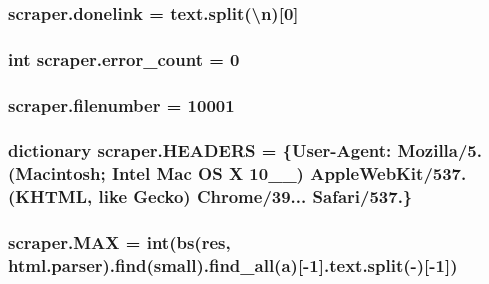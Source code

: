 \subsubsection[{\texorpdfstring{donelink}{donelink}}]{\setlength{\rightskip}{0pt plus 5cm}scraper.\+donelink = text.\+split(\textquotesingle{}\textbackslash{}n\textquotesingle{})\mbox{[}0\mbox{]}}\hypertarget{namespacescraper_a704a8e4e62c4c51619d753bf4d29849b}{}\label{namespacescraper_a704a8e4e62c4c51619d753bf4d29849b}
\subsubsection[{\texorpdfstring{error\+\_\+count}{error_count}}]{\setlength{\rightskip}{0pt plus 5cm}int scraper.\+error\+\_\+count = 0}\hypertarget{namespacescraper_af659a7bd047bbe1870120786cce2d626}{}\label{namespacescraper_af659a7bd047bbe1870120786cce2d626}
\subsubsection[{\texorpdfstring{filenumber}{filenumber}}]{\setlength{\rightskip}{0pt plus 5cm}scraper.\+filenumber = 10001}\hypertarget{namespacescraper_aea7e8854e09bfb4f0ea3454480b6e48a}{}\label{namespacescraper_aea7e8854e09bfb4f0ea3454480b6e48a}
\subsubsection[{\texorpdfstring{H\+E\+A\+D\+E\+RS}{HEADERS}}]{\setlength{\rightskip}{0pt plus 5cm}dictionary scraper.\+H\+E\+A\+D\+E\+RS = \{\textquotesingle{}User-\/Agent\textquotesingle{}\+: \textquotesingle{}Mozilla/5. (Macintosh; Intel Mac OS X 10\+\_\+\_) Apple\+Web\+Kit/537. (\+K\+H\+T\+M\+L, like Gecko) Chrome/39... Safari/537.\textquotesingle{}\}}\hypertarget{namespacescraper_a2b868827f0fdbf8e5deff7fd8866ae2f}{}\label{namespacescraper_a2b868827f0fdbf8e5deff7fd8866ae2f}
\subsubsection[{\texorpdfstring{M\+AX}{MAX}}]{\setlength{\rightskip}{0pt plus 5cm}scraper.\+M\+AX = int(bs({\bf res}, \textquotesingle{}html.\+parser\textquotesingle{}).{\bf find}(\textquotesingle{}small\textquotesingle{}).find\+\_\+all(\textquotesingle{}a\textquotesingle{})\mbox{[}-\/1\mbox{]}.text.\+split(\textquotesingle{}-\/\textquotesingle{})\mbox{[}-\/1\mbox{]})}\hypertarget{namespacescraper_ad6cfc9d30061447ff55ebab4cf14ad49}{}\label{namespacescraper_ad6cfc9d30061447ff55ebab4cf14ad49}
